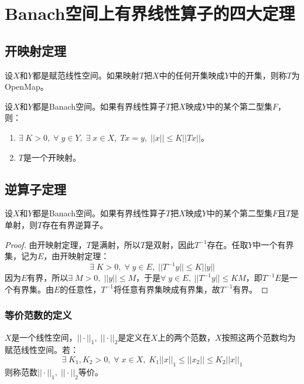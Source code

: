 \section{Banach空间上有界线性算子的四大定理}

\subsection{开映射定理}
\begin{definition}
	设$X$和$Y$都是赋范线性空间。如果映射$T$把$X$中的任何开集映成$Y$中的开集，则称$T$为\gls{OpenMap}。
\end{definition}
\begin{theorem}[开映射定理]
	设$X$和$Y$都是Banach空间。如果有界线性算子$T$把$X$映成$Y$中的某个第二型集$F$，则：
	\begin{enumerate}
		\item $\exists\;K>0,\;\forall\;y\in Y,\;\exists\;x\in X,\;Tx=y,\;||x||\leqslant K||Tx||$。
		\item $T$是一个开映射。
	\end{enumerate}
\end{theorem}

\subsection{逆算子定理}
\begin{theorem}
	设$X$和$Y$都是Banach空间。如果有界线性算子$T$把$X$映成$Y$中的某个第二型集$F$且$T$是单射，则$T$存在有界逆算子。
\end{theorem}
\begin{proof}
	由开映射定理，$T$是满射，所以$T$是双射，因此$T^{-1}$存在。任取$Y$中一个有界集，记为$E$，由开映射定理：
	\begin{equation*}
		\exists\;K>0,\;\forall\;y\in E,\;||T^{-1}y||\leqslant K||y||
	\end{equation*}
	因为$E$有界，所以$\exists\;M>0,\;||y||\leqslant M$，于是$\forall\;y\in E,\;||T^{-1}y||\leqslant KM$，即$T^{-1}E$是一个有界集。由$E$的任意性，$T^{-1}$将任意有界集映成有界集，故$T^{-1}$有界。
\end{proof}
\subsubsection{等价范数的定义}
\begin{definition}
	$X$是一个线性空间，$||\cdot||_1,\;||\cdot||_2$是定义在$X$上的两个范数，$X$按照这两个范数均为赋范线性空间。若：
	\begin{equation*}
		\exists\;K_1,K_2>0,\;\forall\;x\in X,\;K_1||x||_1\leqslant||x_2||\leqslant K_2||x||_1
	\end{equation*}
	则称范数$||\cdot||_1,\;||\cdot||_2$等价。
\end{definition}
